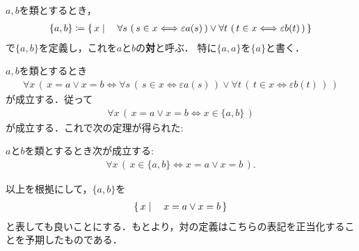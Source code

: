 	\begin{screen}
		\begin{dfn}[対]
			$a,b$を類とするとき，
			\begin{align}
				\{a,b\} \coloneqq \left\{\, x \mid \quad 
					\forall s\, \left(\, s \in x \Longleftrightarrow \varepsilon a(s)\, \right) \vee 
					\forall t\, \left(\, t \in x \Longleftrightarrow \varepsilon b(t)\, \right)\, \right\}
			\end{align}
			で$\{a,b\}$を定義し，これを$a$と$b$の{\bf 対}と呼ぶ．
			特に$\{a,a\}$を$\{a\}$と書く．
		\end{dfn}
	\end{screen}
	
	$a,b$を類とするとき
	\begin{align}
		\forall x\, \left(\, x = a \vee x = b \Longleftrightarrow 
			\forall s\, \left(\, s \in x \Longleftrightarrow \varepsilon a(s)\, \right) \vee 
			\forall t\, \left(\, t \in x \Longleftrightarrow \varepsilon b(t)\, \right)\, 
		\right)
	\end{align}
	が成立する．従って
	\begin{align}
		\forall x\, (\, x=a \vee x=b \Longleftrightarrow x \in \{a,b\}\, )
		\label{eq:definition_of_a_pair_of_classes}
	\end{align}
	が成立する．これで次の定理が得られた:
	
	
	\begin{screen}
		\begin{thm}[対はそこに書かれている要素しか持たない]
		\label{thm:pair_members_are_exactly_the_given_two}
			$a$と$b$を類とするとき次が成立する:
			\begin{align}
				\forall x\, (\, x \in \{a,b\} \Longleftrightarrow x=a \vee x=b\, ).
			\end{align}
		\end{thm}
	\end{screen}
	
	
	以上を根拠にして，$\{a,b\}$を
	\begin{align}
		\left\{\, x \mid \quad x = a \vee x = b\, \right\}
	\end{align}
	と表しても良いことにする．もとより，対の定義はこちらの表記を正当化することを予期したものである．
	
	
